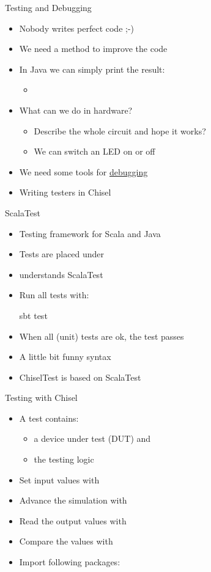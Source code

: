 \begin{frame}[fragile]{Testing and Debugging}
\begin{itemize}
\item Nobody writes perfect code ;-)
\item We need a method to improve the code
\item In Java we can simply print the result:
\begin{itemize}
\item {}
\end{itemize}
\item What can we do in hardware?
\begin{itemize}
\item Describe the whole circuit and hope it works?
\item We can switch an LED on or off
\end{itemize}
\item We need some tools for \href{https://en.wikipedia.org/wiki/Debugging#/media/File:H96566k.jpg}{debugging}
\item Writing testers in Chisel
\end{itemize}
\end{frame}

\begin{frame}[fragile]{ScalaTest}
\begin{itemize}
\item Testing framework for Scala and Java
\item Tests are placed under 
\item {} understands ScalaTest
\item Run all tests with:
\begin{chisel}
sbt test
\end{chisel}
\item When all (unit) tests are ok, the test passes
\item A little bit funny syntax
\item ChiselTest is based on ScalaTest
\end{itemize}
\end{frame}

\begin{frame}[fragile]{Testing with Chisel}
\begin{itemize}
\item A test contains:
\begin{itemize}
\item a device under test (DUT) and
\item the testing logic
\end{itemize}
\item Set input values with 
\item Advance the simulation with 
\item Read the output values with 
\item Compare the values with 
\item Import following packages:
\end{itemize}
\end{frame}

